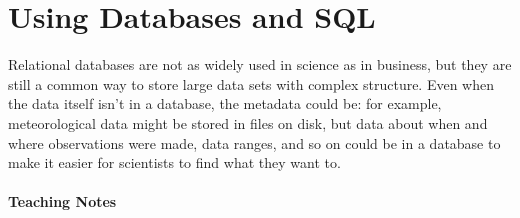 \documentclass{book}
\begin{document}
\section{Using Databases and SQL}

Relational databases are not as widely used in science as in business,
but they are still a common way to store large data sets with complex
structure. Even when the data itself isn't in a database, the metadata
could be: for example, meteorological data might be stored in files on
disk, but data about when and where observations were made, data ranges,
and so on could be in a database to make it easier for scientists to
find what they want to.

\mbox{}\paragraph{Teaching Notes}
\end{document}
